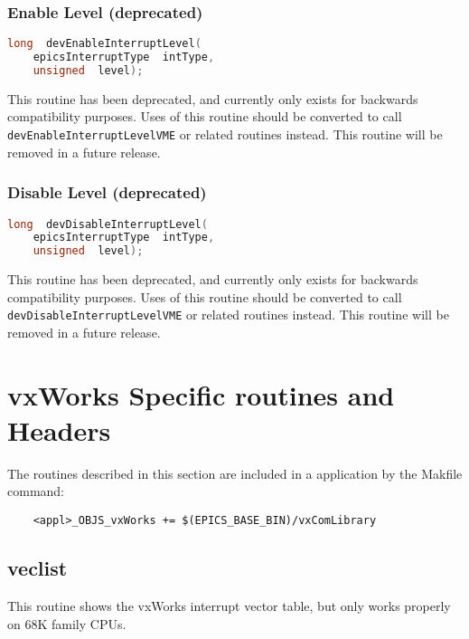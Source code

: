 \subsubsection{Enable Level (deprecated)}

\begin{lstlisting}[language=C]
long  devEnableInterruptLevel(
    epicsInterruptType  intType,
    unsigned  level);
\end{lstlisting}

This routine has been deprecated, and currently only exists for backwards compatibility purposes. Uses of this routine 
should be converted to call \verb|devEnableInterruptLevelVME| or related routines instead. This routine will be removed 
in a future release.

\subsubsection{Disable Level (deprecated)}

\begin{lstlisting}[language=C]
long  devDisableInterruptLevel(
    epicsInterruptType  intType,
    unsigned  level);
\end{lstlisting}

This routine has been deprecated, and currently only exists for backwards compatibility purposes. Uses of this routine 
should be converted to call \verb|devDisableInterruptLevelVME| or related routines instead. This routine will be 
removed in a future release.

\section{vxWorks Specific routines and Headers}

The routines described in this section are included in a application by the Makfile command:

\begin{verbatim}
    <appl>_OBJS_vxWorks += $(EPICS_BASE_BIN)/vxComLibrary
\end{verbatim}

\subsection{veclist}

This routine shows the vxWorks interrupt vector table, but only works properly on 68K family CPUs.

